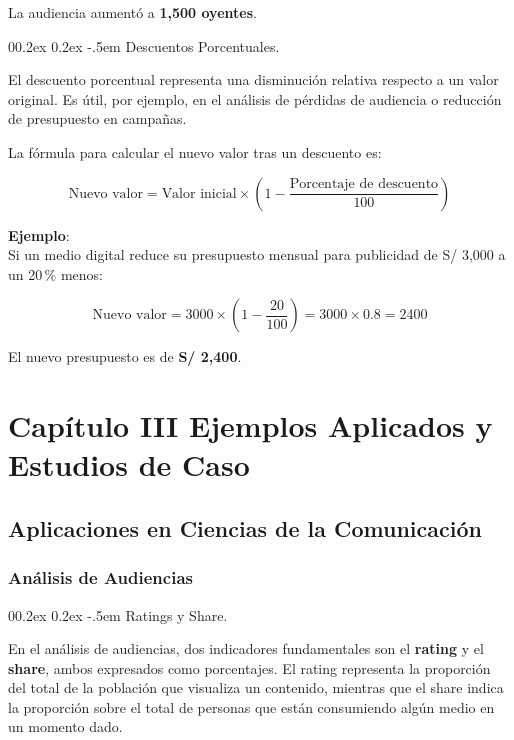 \documentclass[
  stu,
  floatsintext,
  longtable,
  a4paper,
  nolmodern,
  notxfonts,
  notimes,
  colorlinks=true,linkcolor=blue,citecolor=blue,urlcolor=blue]{apa7}
\makeatletter
\renewcommand{\paragraph}{\@startsection{paragraph}{4}{\parindent}%
	{0\baselineskip \@plus 0.2ex \@minus 0.2ex}%
	{-.5em}%
	{\normalfont\normalsize\bfseries\typesectitle}}
\makeatother
\begin{document}
La audiencia aumentó a \textbf{1,500 oyentes}.

\paragraph{Descuentos Porcentuales.}\label{descuentos-porcentuales}

El descuento porcentual representa una disminución relativa respecto a
un valor original. Es útil, por ejemplo, en el análisis de pérdidas de
audiencia o reducción de presupuesto en campañas.

La fórmula para calcular el nuevo valor tras un descuento es:

\[
\text{Nuevo valor} = \text{Valor inicial} \times \left(1 - \frac{\text{Porcentaje de descuento}}{100} \right)
\]

\textbf{Ejemplo}:\\
Si un medio digital reduce su presupuesto mensual para publicidad de S/
3,000 a un 20\,\% menos:

\[
\text{Nuevo valor} = 3000 \times (1 - \frac{20}{100}) = 3000 \times 0.8 = 2400
\]

El nuevo presupuesto es de \textbf{S/ 2,400}.

\section{Capítulo III Ejemplos Aplicados y Estudios de
Caso}\label{capuxedtulo-iii-ejemplos-aplicados-y-estudios-de-caso}

\subsection{Aplicaciones en Ciencias de la
Comunicación}\label{aplicaciones-en-ciencias-de-la-comunicaciuxf3n}

\subsubsection{Análisis de Audiencias}\label{anuxe1lisis-de-audiencias}

\paragraph{Ratings y Share.}\label{ratings-y-share}

En el análisis de audiencias, dos indicadores fundamentales son el
\textbf{rating} y el \textbf{share}, ambos expresados como porcentajes.
El rating representa la proporción del total de la población que
visualiza un contenido, mientras que el share indica la proporción sobre
el total de personas que están consumiendo algún medio en un momento
dado.
\end{document}
